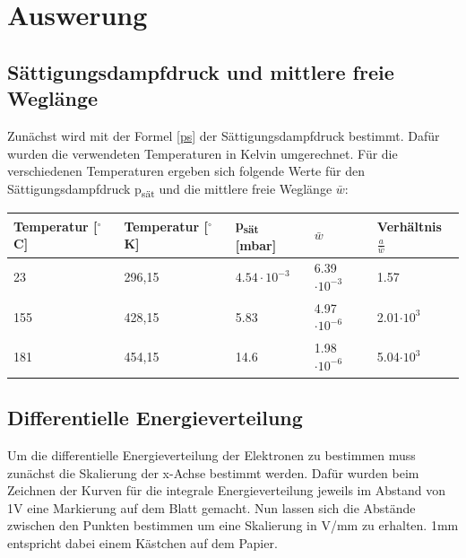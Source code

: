 \section{Auswerung}

\subsection{Sättigungsdampfdruck und mittlere freie Weglänge}

Zunächst wird mit der Formel \ref{ps} der Sättigungsdampfdruck bestimmt.
Dafür wurden die verwendeten Temperaturen in Kelvin umgerechnet.
Für die verschiedenen Temperaturen ergeben sich folgende Werte für den Sättigungsdampfdruck p\textsubscript{sät} und die mittlere freie Weglänge $\bar w$:

\begin{minipage}{\linewidth}
    \begin{table}[H]
        \centering
    
    \begin{tabular}{lllll}
        \toprule
        Temperatur [$^\circ$C] & Temperatur [$^\circ$K] & p\textsubscript{sät} [mbar] & $\bar w$ & Verhältnis $\frac{a}{\bar w} $\\
        \midrule
        23  & 296,15 & $4.54 \cdot 10^{-3}$ & 6.39 $\cdot 10^{-3}$ & 1.57 \\
        155 & 428,15 & 5.83 & 4.97 $\cdot 10^{-6}$ & 2.01$\cdot 10^{3}$ \\
        181 & 454,15 & 14.6 & 1.98 $\cdot 10^{-6}$ & 5.04$\cdot 10^{3}$ \\
        \bottomrule
        
    \end{tabular}
    \label{tab:0}
    \end{table}
    \end{minipage}

\subsection{Differentielle Energieverteilung}

Um die differentielle Energieverteilung der Elektronen zu bestimmen muss zunächst die Skalierung der x-Achse bestimmt werden.
Dafür wurden beim Zeichnen der Kurven für die integrale Energieverteilung jeweils im Abstand von 1V eine Markierung auf dem Blatt gemacht.
Nun lassen sich die Abstände zwischen den Punkten bestimmen um eine Skalierung in V/mm zu erhalten. 1mm entspricht dabei einem Kästchen auf dem Papier.

